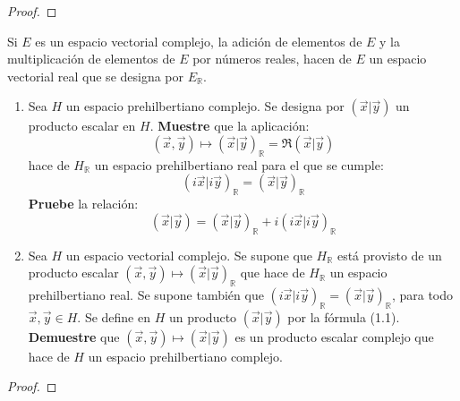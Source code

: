 \documentclass[12pt]{report}
\theoremstyle{largebreak}
\newcommand\pint[2]{\ensuremath{\left(#1\big|#2\right)}}
\begin{document}
    \begin{proof}
        
    \end{proof}

    \begin{excer}
        Si $E$ es un espacio vectorial complejo, la adición de elementos de $E$ y la multiplicación de elementos de $E$ por números reales, hacen de $E$ un espacio vectorial real que se designa por $E_\mathbb{R}$.
        \begin{enumerate}
            \item Sea $H$ un espacio prehilbertiano complejo. Se designa por $\pint{\vec{x}}{\vec{y}}$ un producto escalar en $H$. \textbf{Muestre} que la aplicación:
            \begin{equation*}
                (\vec{x},\vec{y})\mapsto\pint{\vec{x}}{\vec{y}}_\mathbb{R}=\Re\pint{\vec{x}}{\vec{y}}
            \end{equation*}
            hace de $H_\mathbb{R}$ un espacio prehilbertiano real para el que se cumple:
            \begin{equation*}
                \pint{i\vec{x}}{i\vec{y}}_\mathbb{R}=\pint{\vec{x}}{\vec{y}}_\mathbb{R}
            \end{equation*}
            \textbf{Pruebe} la relación:
            \begin{equation}
                \pint{\vec{x}}{\vec{y}}=\pint{\vec{x}}{\vec{y}}_\mathbb{R}+i\pint{i\vec{x}}{i\vec{y}}_\mathbb{R}
            \end{equation}
            \item Sea $H$ un espacio vectorial complejo. Se supone que $H_\mathbb{R}$ está provisto de un producto escalar $(\vec{x},\vec{y})\mapsto\pint{\vec{x}}{\vec{y}}_\mathbb{R}$ que hace de $H_\mathbb{R}$ un espacio prehilbertiano real. Se supone también que $\pint{i\vec{x}}{i\vec{y}}_\mathbb{R}=\pint{\vec{x}}{\vec{y}}_\mathbb{R}$, para todo $\vec{x},\vec{y}\in H$. Se define en $H$ un producto $\pint{\vec{x}}{\vec{y}}$ por la fórmula (1.1). \textbf{Demuestre} que $(\vec{x},\vec{y})\mapsto\pint{\vec{x}}{\vec{y}}$ es un producto escalar complejo que hace de $H$ un espacio prehilbertiano complejo. 
        \end{enumerate}
    \end{excer}

    \begin{proof}
        
    \end{proof}
\end{document}

